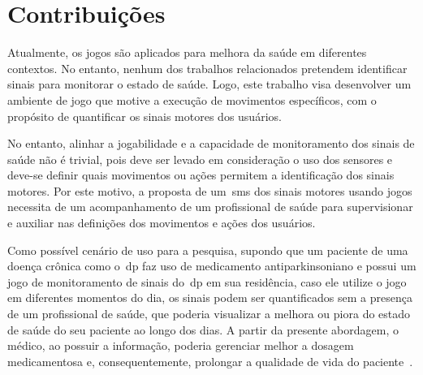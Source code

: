 \section{Contribuições}
Atualmente, os jogos são aplicados para melhora da saúde em diferentes contextos. No entanto, nenhum dos trabalhos relacionados pretendem identificar sinais para monitorar o estado de saúde. Logo, este trabalho visa desenvolver um ambiente de jogo que motive a execução de movimentos específicos, com o propósito de quantificar os sinais motores dos usuários.

No entanto, alinhar a jogabilidade e a capacidade de monitoramento dos sinais de saúde não é trivial, pois deve ser levado em consideração o uso dos sensores e deve-se definir quais movimentos ou ações permitem a identificação dos sinais motores. Por este motivo, a proposta de um~\ac{sms} dos sinais motores usando jogos necessita de um acompanhamento de um profissional de saúde para supervisionar e auxiliar nas definições dos movimentos e ações dos usuários. 


Como possível cenário de uso para a pesquisa, supondo que um paciente de uma doença crônica como o~\ac{dp} faz uso de medicamento antiparkinsoniano e possui um jogo de monitoramento de sinais do~\ac{dp} em sua residência, caso ele utilize o jogo em diferentes momentos do dia, os sinais podem ser quantificados sem a presença de um profissional de saúde, que poderia visualizar a melhora ou piora do estado de saúde do seu paciente ao longo dos dias. A partir da presente abordagem, o médico, ao possuir a informação, poderia gerenciar melhor a dosagem medicamentosa e, consequentemente, prolongar a qualidade de vida do paciente~\cite{rodrigues2006}.

